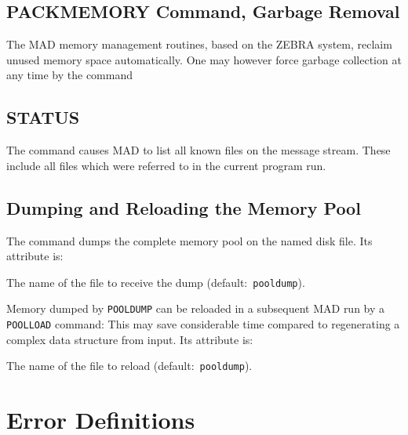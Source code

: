 \section{PACKMEMORY Command, Garbage Removal}
\label{S-PACKMEM}
The MAD memory management routines, based on the ZEBRA system,
reclaim unused memory space automatically.
One may however force garbage collection at any time by the
 command
 
\section{STATUS}
\label{S-STATUS}
The  command
causes MAD to list all known files on the message stream.
These include all files which were referred to in the current
program run.
 
\section{Dumping and Reloading the Memory Pool}
\label{S-POOL}
The  command
dumps the complete memory pool on the named disk file.
Its attribute is:
\begin{mylist}
The name of the file to receive the dump (default:~{\tt pooldump}).
\end{mylist}
Memory dumped by {\tt POOLDUMP} can be reloaded in a subsequent
MAD run by a {\tt POOLLOAD} command:
This may save considerable time compared to regenerating a complex
data structure from input.
Its attribute is:
\begin{mylist}
The name of the file to reload (default:~{\tt pooldump}).
\end{mylist}
 
\chapter{Error Definitions}
\label{S-ERROR}
 
